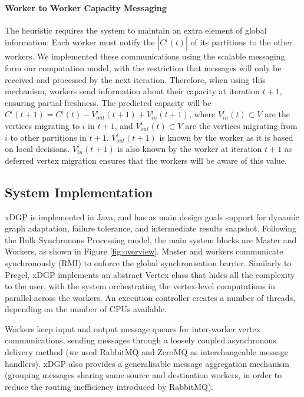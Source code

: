 \documentclass{sig-alternate-10pt}
\begin{document}
\paragraph{\textbf{Worker to Worker Capacity Messaging}} The heuristic requires the system to maintain an extra element of global information: Each worker must notify the $|C^i(t)|$ of its partitions to the other workers. We implemented these communications using the scalable messaging form our computation model, with the restriction that messages will only be received and processed by the next iteration.  Therefore, when using this mechanism, workers  send information about their capacity at iteration $t+1$, ensuring partial freshness. The predicted capacity will be $C^{i}(t+1) = C^i(t) - V_{out}^{i}(t+1)+ V_{in}^{i}(t+1)  $, where $V_{in}^{i}(t) \subset V $ are the vertices migrating to $i$ in $t+1$, and $V_{out}^{i}(t) \subset V $ are the vertices migrating from $i$ to other partitions in $t+1$. $V_{out}^{i}(t+1)$ is known by the worker as it is based on local decisions.  $V_{in}^{i}(t+1)$ is also known by the worker at iteration $t+1$ as deferred vertex migration ensures that the workers will be aware of this value. 

\subsection{System Implementation}

xDGP  is implemented in Java, and has as main design goals support for dynamic graph adaptation, failure tolerance, and intermediate results snapshot. Following the Bulk Synchronous Processing \cite{Valiant1990} model, the main system blocks are Master and Workers, as shown in Figure \ref{fig:overview}. Master and workers communicate synchronously (RMI) to enforce the global synchronisation barrier. Similarly to Pregel, xDGP implements an abstract Vertex class that hides all the complexity to the user, with the system orchestrating the vertex-level computations in parallel across the workers. An execution controller creates a number of threads, depending on the number of CPUs available. 

Workers keep input and output message queues for inter-worker vertex communications, sending messages through a loosely coupled asynchronous delivery method (we used RabbitMQ and ZeroMQ as interchangeable message handlers). xDGP also provides a generalisable message aggregation mechanism (grouping messages sharing same source and destination workers, in order to reduce the routing inefficiency introduced by RabbitMQ).
\end{document}
